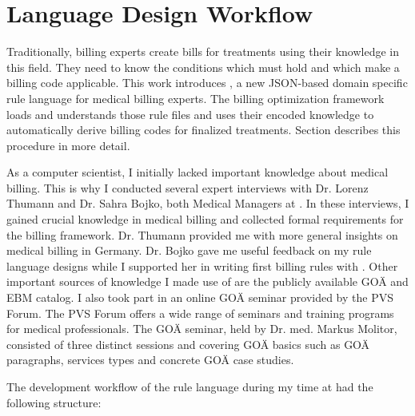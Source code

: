 \section{Language Design Workflow}\label{sec:language-design-workflow}
Traditionally, billing experts create bills for treatments using their knowledge in this field.
They need to know the conditions which must hold and which make a billing code applicable.
This work introduces \RL, a new JSON-based domain specific rule language for medical billing experts.
The billing optimization framework loads and understands those rule files and uses their encoded knowledge to automatically derive billing codes for finalized treatments.
Section  describes this procedure in more detail.

As a computer scientist, I initially lacked important knowledge about medical billing.
This is why I conducted several expert interviews with Dr. Lorenz Thumann and Dr. Sahra Bojko, both Medical Managers at \AV.
In these interviews, I gained crucial knowledge in medical billing and collected formal requirements for the billing framework.
Dr. Thumann provided me with more general insights on medical billing in Germany.
Dr. Bojko gave me useful feedback on my rule language designs while I supported her in writing first billing rules with \RL.
Other important sources of knowledge I made use of are the publicly available GOÄ and EBM catalog.
I also took part in an online GOÄ seminar provided by the PVS Forum.
The PVS Forum offers a wide range of seminars and training programs for medical professionals.
The GOÄ seminar, held by Dr. med. Markus Molitor,
consisted of three distinct sessions and covering GOÄ basics such as GOÄ paragraphs, services types and concrete GOÄ case studies.

The development workflow of the rule language during my time at \AV had the following structure:

